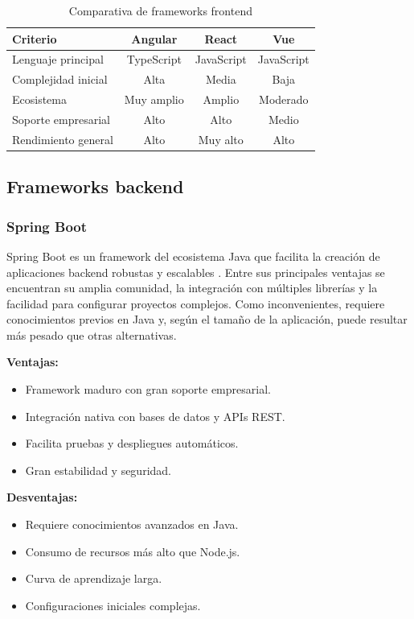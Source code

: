 \begin{table}[H]
\centering
\begin{tabular}{|l|c|c|c|}
\hline
\textbf{Criterio} & \textbf{Angular} & \textbf{React} & \textbf{Vue} \\ \hline
Lenguaje principal & TypeScript & JavaScript & JavaScript \\ \hline
Complejidad inicial & Alta & Media & Baja \\ \hline
Ecosistema & Muy amplio & Amplio & Moderado \\ \hline
Soporte empresarial & Alto & Alto & Medio \\ \hline
Rendimiento general & Alto & Muy alto & Alto \\ \hline
\end{tabular}
\caption{Comparativa de frameworks frontend}
\end{table}


\subsection{Frameworks backend}

\subsubsection{Spring Boot}
Spring Boot es un framework del ecosistema Java que facilita la creación de aplicaciones backend robustas y escalables \cite{springDocs}. Entre sus principales ventajas se encuentran su amplia comunidad, la integración con múltiples librerías y la facilidad para configurar proyectos complejos. Como inconvenientes, requiere conocimientos previos en Java y, según el tamaño de la aplicación, puede resultar más pesado que otras alternativas.

\textbf{Ventajas:}
\begin{itemize}
    \item Framework maduro con gran soporte empresarial.
    \item Integración nativa con bases de datos y APIs REST.
    \item Facilita pruebas y despliegues automáticos.
    \item Gran estabilidad y seguridad.
\end{itemize}

\textbf{Desventajas:}
\begin{itemize}
    \item Requiere conocimientos avanzados en Java.
    \item Consumo de recursos más alto que Node.js.
    \item Curva de aprendizaje larga.
    \item Configuraciones iniciales complejas.
\end{itemize}

